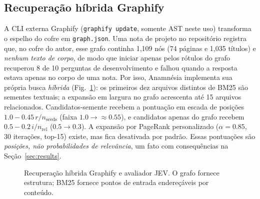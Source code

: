 \documentclass[conference,onecolumn,11pt]{IEEEtran}
\newcommand{\anam}{Anam\-n\'esia}
\begin{document}
\subsection{Recuperação híbrida Graphify}\label{sec:graphify}
A CLI externa Graphify (\texttt{graphify update}, somente AST neste uso) transforma o espelho do cofre em \texttt{graph.json}. Uma nota de projeto no repositório registra que, no cofre do autor, esse grafo continha 1,109 nós (74 páginas e 1,035 títulos) e \emph{nenhum texto de corpo}, de modo que iniciar apenas pelos rótulos do grafo recuperou 8 de 10 perguntas de desenvolvimento e falhou quando a resposta estava apenas no corpo de uma nota. Por isso, \anam{} implementa sua própria busca \emph{híbrida} (Fig.~\ref{fig:graph}): os primeiros dez arquivos distintos de BM25 são sementes textuais; a expansão em largura no grafo acrescenta até 15 arquivos relacionados. Candidatos-semente recebem a pontuação em escada de posições $1.0-0.45\,r/n_{\text{seeds}}$ (faixa $1.0\to\approx0.55$), e candidatos apenas do grafo recebem $0.5-0.2\,i/n_{\text{rel}}$ ($0.5\to0.3$). A expansão por PageRank personalizado ($\alpha{=}0.85$, 30 iterações, top-15) existe, mas fica desativada por padrão. Essas pontuações são \emph{posições, não probabilidades de relevância}, um fato com consequências na Seção~\ref{sec:results}.

\begin{figure}[!htbp]\centering
{}
\caption{Recuperação híbrida Graphify e avaliador JEV. O grafo fornece estrutura; BM25 fornece pontos de entrada endereçáveis por conteúdo.}\label{fig:graph}
\end{figure}
\end{document}
